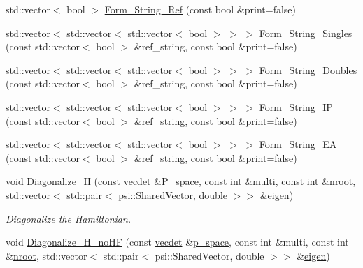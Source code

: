 \begin{DoxyCompactItemize}
std\+::vector$<$ bool $>$ \mbox{\hyperlink{classforte_1_1_f_c_i___m_o_add69e1a28a6ed06b933980aa9e3e9c62}{Form\+\_\+\+String\+\_\+\+Ref}} (const bool \&print=false)
\item 
std\+::vector$<$ std\+::vector$<$ std\+::vector$<$ bool $>$ $>$ $>$ \mbox{\hyperlink{classforte_1_1_f_c_i___m_o_a06d2dc3001cfbbf2668bd698d28f5815}{Form\+\_\+\+String\+\_\+\+Singles}} (const std\+::vector$<$ bool $>$ \&ref\+\_\+string, const bool \&print=false)
\item 
std\+::vector$<$ std\+::vector$<$ std\+::vector$<$ bool $>$ $>$ $>$ \mbox{\hyperlink{classforte_1_1_f_c_i___m_o_aca9a55627ced6f14b3c2724baee28959}{Form\+\_\+\+String\+\_\+\+Doubles}} (const std\+::vector$<$ bool $>$ \&ref\+\_\+string, const bool \&print=false)
\item 
std\+::vector$<$ std\+::vector$<$ std\+::vector$<$ bool $>$ $>$ $>$ \mbox{\hyperlink{classforte_1_1_f_c_i___m_o_a477f4d38d6423f1ffa0672081d00e5b1}{Form\+\_\+\+String\+\_\+\+IP}} (const std\+::vector$<$ bool $>$ \&ref\+\_\+string, const bool \&print=false)
\item 
std\+::vector$<$ std\+::vector$<$ std\+::vector$<$ bool $>$ $>$ $>$ \mbox{\hyperlink{classforte_1_1_f_c_i___m_o_ac639d453e0bafafb6d2fa50e389f2e56}{Form\+\_\+\+String\+\_\+\+EA}} (const std\+::vector$<$ bool $>$ \&ref\+\_\+string, const bool \&print=false)
\item 
void \mbox{\hyperlink{classforte_1_1_f_c_i___m_o_a3028e42a3b4e87f299d73591b1b6454e}{Diagonalize\+\_\+H}} (const \mbox{\hyperlink{fci__mo_8h_a777ccac2de1a8940d2f654e59ff12f06}{vecdet}} \&P\+\_\+space, const int \&multi, const int \&\mbox{\hyperlink{classforte_1_1_active_space_method_aa2bafc732bd7023fd32fbd263ef2e903}{nroot}}, std\+::vector$<$ std\+::pair$<$ psi\+::\+Shared\+Vector, double $>$$>$ \&\mbox{\hyperlink{classforte_1_1_f_c_i___m_o_a7c37f298fb6cbe8870b75d5fa3faa7c9}{eigen}})
\begin{DoxyCompactList}\small\item\em Diagonalize the Hamiltonian. \end{DoxyCompactList}\item 
void \mbox{\hyperlink{classforte_1_1_f_c_i___m_o_a8eb4d64d6f937a4885499a4871fd066f}{Diagonalize\+\_\+\+H\+\_\+no\+HF}} (const \mbox{\hyperlink{fci__mo_8h_a777ccac2de1a8940d2f654e59ff12f06}{vecdet}} \&\mbox{\hyperlink{classforte_1_1_f_c_i___m_o_a1c6e8fd8e4bcb8999665fa9ac17da1a0}{p\+\_\+space}}, const int \&multi, const int \&\mbox{\hyperlink{classforte_1_1_active_space_method_aa2bafc732bd7023fd32fbd263ef2e903}{nroot}}, std\+::vector$<$ std\+::pair$<$ psi\+::\+Shared\+Vector, double $>$$>$ \&\mbox{\hyperlink{classforte_1_1_f_c_i___m_o_a7c37f298fb6cbe8870b75d5fa3faa7c9}{eigen}})

\end{DoxyCompactItemize}
